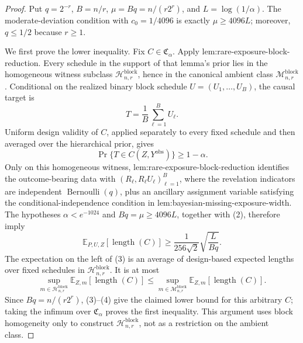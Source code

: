 \documentclass{article}
\begin{document}
\begin{proof}
Put \(q=2^{-r}\), \(B=n/r\), \(\mu=Bq=n/(r2^r)\), and \(L=\log(1/\alpha)\). The moderate-deviation condition with \(c_0=1/4096\) is exactly \(\mu\ge4096L\); moreover, \(q\le1/2\) because \(r\ge1\).

We first prove the lower inequality. Fix \(C\in\mathfrak C_\alpha\). Apply lem:rare-exposure-block-reduction. Every schedule in the support of that lemma's prior lies in the homogeneous witness subclass \(\mathcal H_{n,r}^{\mathrm{block}}\), hence in the canonical ambient class \(\mathcal M_{n,r}^{\mathrm{block}}\). Conditional on the realized binary block schedule \(U=(U_1,\ldots,U_B)\), the causal target is
\[
T=\frac1B\sum_{\ell=1}^B U_\ell. \tag{1}
\]
Uniform design validity of \(C\), applied separately to every fixed schedule and then averaged over the hierarchical prior, gives
\[
\Pr\{T\in C(Z,Y^{\mathrm{obs}})\}\ge1-\alpha. \tag{2}
\]
Only on this homogeneous witness, lem:rare-exposure-block-reduction identifies the outcome-bearing data with \((R_\ell,R_\ell U_\ell)_{\ell=1}^B\), where the revelation indicators are independent \(\operatorname{Bernoulli}(q)\), plus an ancillary assignment variable satisfying the conditional-independence condition in lem:bayesian-missing-exposure-width. The hypotheses \(\alpha<e^{-1024}\) and \(Bq=\mu\ge4096L\), together with (2), therefore imply
\[
\mathbb E_{P,U,Z}[\operatorname{length}(C)]\ge\frac1{256\sqrt2}\sqrt{\frac{L}{Bq}}. \tag{3}
\]
The expectation on the left of (3) is an average of design-based expected lengths over fixed schedules in \(\mathcal H_{n,r}^{\mathrm{block}}\). It is at most
\[
\sup_{m\in\mathcal H_{n,r}^{\mathrm{block}}}\mathbb E_{Z,m}[\operatorname{length}(C)]\le\sup_{m\in\mathcal M_{n,r}^{\mathrm{block}}}\mathbb E_{Z,m}[\operatorname{length}(C)]. \tag{4}
\]
Since \(Bq=n/(r2^r)\), (3)--(4) give the claimed lower bound for this arbitrary \(C\); taking the infimum over \(\mathfrak C_\alpha\) proves the first inequality. This argument uses block homogeneity only to construct \(\mathcal H_{n,r}^{\mathrm{block}}\), not as a restriction on the ambient class.


\end{proof}
\end{document}
